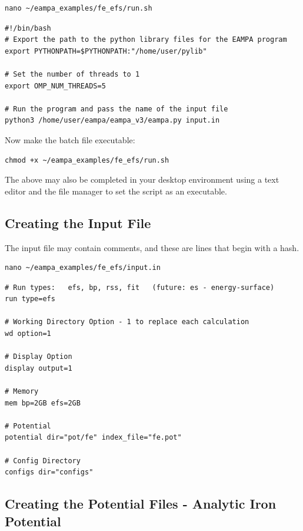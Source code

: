 \documentclass[12pt,twoside]{manual}
\begin{document}
\begin{lstlisting}
nano ~/eampa_examples/fe_efs/run.sh
\end{lstlisting}

\begin{lstlisting}
#!/bin/bash
# Export the path to the python library files for the EAMPA program
export PYTHONPATH=$PYTHONPATH:"/home/user/pylib"

# Set the number of threads to 1
export OMP_NUM_THREADS=5

# Run the program and pass the name of the input file
python3 /home/user/eampa/eampa_v3/eampa.py input.in
\end{lstlisting}

Now make the batch file executable:

\begin{lstlisting}
chmod +x ~/eampa_examples/fe_efs/run.sh
\end{lstlisting}

The above may also be completed in your desktop environment using a text editor and the file manager to set the script as an executable.




\subsection{Creating the Input File}

The input file may contain comments, and these are lines that begin with a hash.

\begin{lstlisting}
nano ~/eampa_examples/fe_efs/input.in
\end{lstlisting}

\begin{lstlisting}
# Run types:   efs, bp, rss, fit   (future: es - energy-surface)
run type=efs

# Working Directory Option - 1 to replace each calculation
wd option=1

# Display Option
display output=1

# Memory
mem bp=2GB efs=2GB

# Potential
potential dir="pot/fe" index_file="fe.pot"

# Config Directory
configs dir="configs"
\end{lstlisting}

\subsection{Creating the Potential Files - Analytic Iron Potential}
\end{document}
